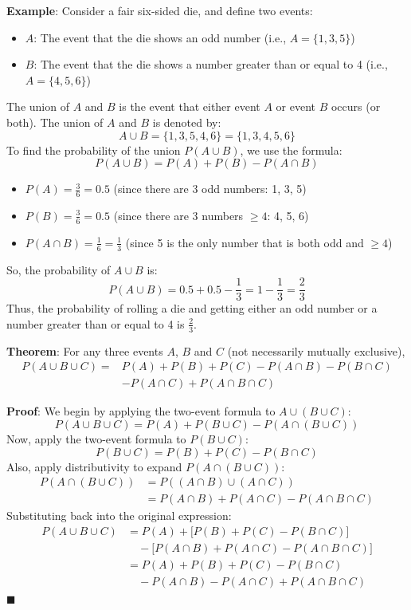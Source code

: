 \documentclass[twoside]{book}
\begin{document}
\textbf{Example}: Consider a fair six-sided die, and define two events:
\begin{itemize}
    \item $A$: The event that the die shows an odd number (i.e., $A = \{1, 3, 5\}$)
    \item $B$: The event that the die shows a number greater than or equal to 4 (i.e.,  $A = \{4,5,6\}$)
\end{itemize}

The union of \( A \) and \( B \) is the event that either event \( A \) or event \( B \) occurs (or both). The union of \( A \) and \( B \) is denoted by:
\[
A \cup B = \{1, 3, 5, 4, 6\} = \{1, 3, 4, 5, 6\}
\]
To find the probability of the union \( P(A \cup B) \), we use the formula:
\[
P(A \cup B) = P(A) + P(B) - P(A \cap B)
\]
\begin{itemize}
    \item \( P(A) = \frac{3}{6} = 0.5 \) (since there are 3 odd numbers: 1, 3, 5)
    \item \( P(B) = \frac{3}{6} = 0.5 \) (since there are 3 numbers \( \geq 4 \): 4, 5, 6)
    \item \( P(A \cap B) = \frac{1}{6} = \frac{1}{3} \) (since 5 is the only number that is both odd and \( \geq 4 \))
\end{itemize}

So, the probability of \( A \cup B \) is:
\[
P(A \cup B) = 0.5 + 0.5 - \frac{1}{3} = 1 - \frac{1}{3} = \frac{2}{3}
\]
Thus, the probability of rolling a die and getting either an odd number or a number greater than or equal to 4 is \( \frac{2}{3} \).


\begin{textbox}
\textbf{Theorem}: For any three events $A$, $B$ and $C$ (not necessarily mutually exclusive),
\begin{align*}
    P(A \cup B \cup C) = &P(A) + P(B) +P(C) - P(A \cap B) - P(B \cap C) \\
    &- P(A \cap C)  + P(A \cap B \cap C)
\end{align*}
\end{textbox}

\textbf{Proof}: We begin by applying the two-event formula to $A \cup (B \cup C)$:
$$P(A \cup B \cup C) = P(A) + P(B \cup C) - P(A \cap (B \cup C))$$
Now, apply the two-event formula to $P(B \cup C)$:
$$P(B \cup C) = P(B) + P(C) - P(B \cap C)$$
Also, apply distributivity to expand \( P(A \cap (B \cup C)) \):
\begin{align*}
P(A \cap (B \cup C)) &= P((A \cap B) \cup (A \cap C)) \\
&= P(A \cap B) + P(A \cap C) - P(A \cap B \cap C)
\end{align*}
Substituting back into the original expression:
\begin{align*}
P(A \cup B \cup C) &= P(A) + \big[ P(B) + P(C) - P(B \cap C) \big] \\
&\quad - \big[ P(A \cap B) + P(A \cap C) - P(A \cap B \cap C) \big] \\
&= P(A) + P(B) + P(C) - P(B \cap C) \\
&\quad - P(A \cap B) - P(A \cap C) + P(A \cap B \cap C)
\end{align*}
\hfill\(\blacksquare\)
\end{document}
